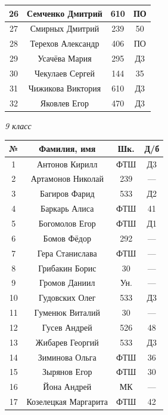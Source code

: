 \documentclass[12pt]{article}
\newlength{\h}
\newlength{\x}
\begin{document}
\begin{table}[ht]
\begin{minipage}[t]{0.48\linewidth}
\begin{tabular}[h]{|c|c|c|c|}
      26 & Семченко Дмитрий & 610 & ПО \\ \hline
      27 & Смирных Дмитрий & 239 & 50 \\ \hline
      28 & Терехов Александр & 406 & ПО \\ \hline
      29 & Усачёва Мария & 295 & Д3 \\ \hline
      30 & Чекулаев Сергей & 144 & 35 \\ \hline
      31 & Чижикова Виктория & 610 & Д3 \\ \hline
      32 & Яковлев Егор & 470 & Д3 \\ \hline
    \end{tabular}
  \end{minipage}
  \hfill
  \begin{minipage}[t]{0.48\linewidth}\centering
    \begin{center}
      \textit{9 класс}
    \end{center}
    \begin{tabular}[h]{|c|c|c|c|}
      \hline
      \textbf{№} & \textbf{Фамилия, имя} & \textbf{Шк.} & \textbf{Д/б}\\
      \hline
      1 & Антонов Кирилл & ФТШ & Д3  \\ \hline
      2 & Артамонов Николай & 239 & ---  \\ \hline
      3 & Багиров Фарид & 533 & Д2  \\ \hline
      4 & Баркарь Алиса & ФТШ & 41  \\ \hline
      5 & Богомолов Егор & ФТШ & Д1  \\ \hline
      6 & Бомов Фёдор & 292 & ---  \\ \hline
      7 & Гера Станислава & ФТШ & ---  \\ \hline
      8 & Грибакин Борис & 30 & ---  \\ \hline
      9 & Громов Даниил & Ун. & ---  \\ \hline
      10 & Гудовских Олег & 533 & Д3  \\ \hline
      11 & Гуменюк Виталий & 30 & ---  \\ \hline
      12 & Гусев Андрей & 526 & 48  \\ \hline
      13 & Жибарев Георгий & 533 & Д3  \\ \hline
      14 & Зиминова Ольга & ФТШ & 36  \\ \hline
      15 & Зырянов Егор & ФТШ & 30 \\ \hline
      16 & Йона Андрей & МК & ---  \\ \hline
      17 & Козелецкая Маргарита & ФТШ & 42  \\ \hline

\end{tabular}
\end{minipage}
\end{table}
\end{document}
